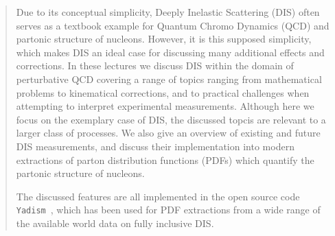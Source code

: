 
\begin{abstract}%
  Due to its conceptual simplicity, Deeply Inelastic Scattering (DIS) often serves as a textbook example for Quantum Chromo Dynamics (QCD) and partonic structure of nucleons.
  However, it is this supposed simplicity, which makes DIS an ideal case for discussing many additional effects and corrections.
  In these lectures we discuss DIS within the domain of perturbative QCD covering a range of topics ranging from mathematical problems to kinematical corrections, and to practical challenges when attempting to interpret experimental measurements.
  Although here we focus on the exemplary case of DIS, the discussed topcis are relevant to a larger class of processes.
  We also give an overview of existing and future DIS measurements, and discuss their implementation into modern extractions of parton distribution functions (PDFs) which quantify the partonic structure of nucleons.

  The discussed features are all implemented in the open source code \texttt{Yadism}~\cite{Candido:2024rkr,barontini_2026_18758473}, which has been used for PDF extractions from a wide range of the available world data on fully inclusive DIS.
\end{abstract}




